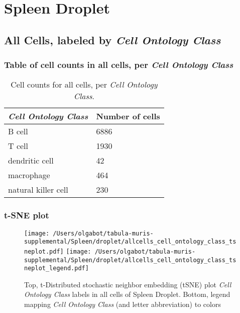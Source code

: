 \clearpage
\section{Spleen Droplet}

\subsection{All Cells, labeled by \emph{Cell Ontology Class}}
\subsubsection{Table of cell counts in all cells, per \emph{Cell Ontology Class}}\begin{table}[h]
\centering
\label{my-label}
\begin{tabular}{@{}ll@{}}
\toprule

\emph{Cell Ontology Class}& Number of cells \\ \midrule
B cell & 6886 \\

T cell & 1930 \\

dendritic cell & 42 \\

macrophage & 464 \\

natural killer cell & 230 \\
\bottomrule
\end{tabular}
\caption{Cell counts for all cells, per \emph{Cell Ontology Class}.}
\end{table}

\clearpage
\subsubsection{t-SNE plot}
\begin{figure}[h]
\centering
\texttt{[image: /Users/olgabot/tabula-muris-supplemental/Spleen/droplet/allcells\_cell\_ontology\_class\_tsneplot.pdf]}
\texttt{[image: /Users/olgabot/tabula-muris-supplemental/Spleen/droplet/allcells\_cell\_ontology\_class\_tsneplot\_legend.pdf]}
\caption{Top, t-Distributed stochastic neighbor embedding (tSNE) plot  \emph{Cell Ontology Class} labels in all cells of Spleen Droplet. Bottom, legend mapping \emph{Cell Ontology Class} (and letter abbreviation) to colors}
\end{figure}


\clearpage

